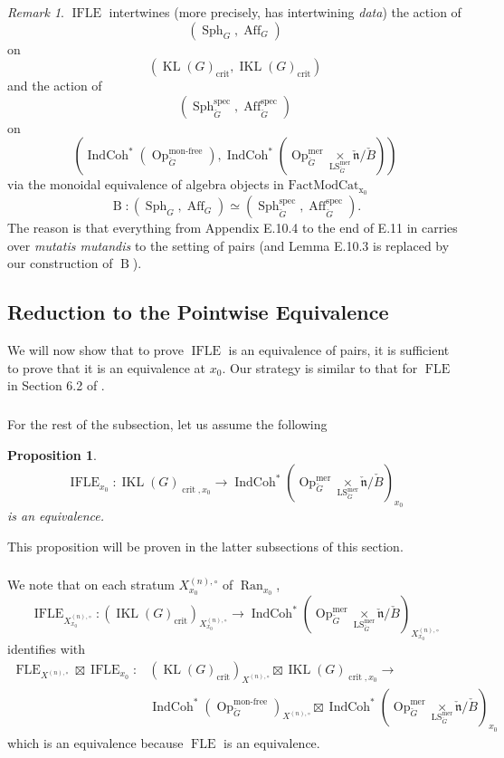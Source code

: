 \documentclass[10pt]{amsart}
\newtheorem{prop}[subsubsection]{Proposition}
\theoremstyle{remark}
\newtheorem{rem}[subsubsection]{Remark}
\newcommand{\on}[1]{\operatorname{#1}}
\newcommand{\IndCoh}{\on{IndCoh}}
\newcommand{\KL}{\on{KL}(G)_{\on{crit}}}
\newcommand{\IKL}{\on{IKL}(G)_{\on{crit}}}
\newcommand{\IKLx}{\on{IKL}(G)_{\on{crit}, x_0}}
\newcommand{\Gcheck}{\check{G}}
\newcommand{\ncheck}{\check{\mathfrak{n}}}
\newcommand{\Bcheck}{\check{B}}
\newcommand{\Ran}{\on{Ran}}
\newcommand{\FactModCat}{\on{FactModCat_{x_0}}}
\newcommand{\sssec}[1]{\subsubsection{}}
\begin{document}
\begin{rem}
$\on{IFLE}$ intertwines (more precisely, has intertwining \emph{data}) the action of 
$$
(\on{Sph}_{G}, \on{Aff}_G)
$$ on 
$$
(\KL, \IKL)
$$
and the action of 
$$
(\on{Sph}_{\Gcheck}^{\on{spec}}, \on{Aff}_{\Gcheck}^{\on{spec}})
$$ on 
$$
(\IndCoh^*(\on{Op}_{\Gcheck}^{\on{mon-free}}), \IndCoh^*(\on{Op}_{\Gcheck}^{\on{mer}} \underset{\on{LS}_{\Gcheck}^{\on{mer}}}{\times} \ncheck/\Bcheck))
$$
via the monoidal equivalence of algebra objects in $\FactModCat$ 
$$
\on{B} : (\on{Sph}_{G}, \on{Aff}_G) \simeq (\on{Sph}_{\Gcheck}^{\on{spec}}, \on{Aff}_{\Gcheck}^{\on{spec}}).
$$
The reason is that everything from Appendix E.10.4 to the end of E.11 in \cite{GLC2} carries over \emph{mutatis mutandis} to the setting of pairs (and Lemma E.10.3 is replaced by our construction of $\on{B}$).
\end{rem}

\subsection{Reduction to the Pointwise Equivalence} \label{Reduction to the Pointwise Equivalence}
We will now show that to prove $\on{IFLE}$ is an equivalence of pairs, it is sufficient to prove that it is an equivalence at $x_0$. Our strategy is similar to that for $\on{FLE}$ in Section 6.2 of \cite{GLC2}.

\sssec{}
For the rest of the subsection, let us assume the following
\begin{prop} \label{pointwise IFLE}
$$
\on{IFLE}_{x_0} : \IKLx \to \IndCoh^*(\on{Op}_{\Gcheck}^{\on{mer}} \underset{\on{LS}_{\Gcheck}^{\on{mer}}}{\times} \ncheck/\Bcheck)_{x_0}
$$
is an equivalence.
\end{prop}
This proposition will be proven in the latter subsections of this section.

\sssec{}
We note that on each stratum $X_{x_0}^{(n), \circ}$ of $\Ran_{x_0}$,
$$
\on{IFLE}_{X_{x_0}^{(n), \circ}} : (\IKL)_{X_{x_0}^{(n), \circ}} \to \IndCoh^*(\on{Op}_{\Gcheck}^{\on{mer}} \underset{\on{LS}_{\Gcheck}^{\on{mer}}}{\times} \ncheck/\Bcheck)_{X_{x_0}^{(n), \circ}}
$$
identifies with
\begin{align}
\on{FLE}_{X^{(n), \circ}} \boxtimes \on{IFLE}_{x_0} : &(\KL)_{X^{(n), \circ}} \boxtimes \IKLx \to \\
&\IndCoh^*(\on{Op}_{\Gcheck}^{\on{mon-free}})_{X^{(n), \circ}} \boxtimes \IndCoh^*(\on{Op}_{\Gcheck}^{\on{mer}} \underset{\on{LS}_{\Gcheck}^{\on{mer}}}{\times} \ncheck/\Bcheck)_{x_0}
\end{align}
which is an equivalence because $\on{FLE}$ is an equivalence.
\end{document}
